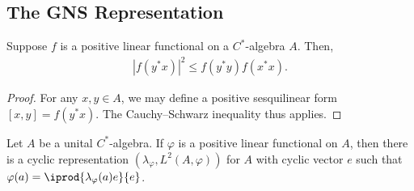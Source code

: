 \documentclass[10pt]{mypackage}
\begin{document}
\subsection{The GNS Representation}%
\begin{proposition}
  Suppose $f$ is a positive linear functional on a $C^{\ast}$-algebra $A$. Then,
  \begin{align*}
    \left\vert f\left( y^{\ast}x \right) \right\vert^2 \leq f\left( y^{\ast}y \right)f\left( x^{\ast}x \right).
  \end{align*}
\end{proposition}
\begin{proof}
  For any $x,y\in A$, we may define a positive sesquilinear form $\left[ x,y \right] = f\left( y^{\ast}x \right)$. The Cauchy--Schwarz inequality thus applies.
\end{proof}
\begin{theorem}
  Let $A$ be a unital $C^{\ast}$-algebra. If $\varphi$ is a positive linear functional on $A$, then there is a cyclic representation $\left( \lambda_\varphi,L^2\left( A,\varphi \right) \right)$ for $A$ with cyclic vector $e$ such that $\varphi(a) = \iprod{\lambda_{\varphi}(a)e}{e}$.
\end{theorem}
\end{document}
